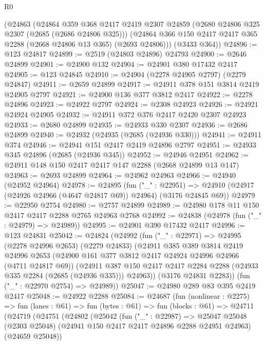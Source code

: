 \begin{lexlean}{R0}
\begin{coremodule}
    (@24863
      (@24864
        @359
        @368
        @2417
        @2419
        @2307
        @24859
        (@2680 @24806 @325 @2307 (@2685 (@2686 @24806 @325)))
        (@24864 @366 @150 @2417 @2417 @365 @2288 (@2668 @24806 @13 @365) (@2693 @24806)))
      (@3433 @364))
@24896 := @123 @24817
@24899 := @2519 (@24803 @24896) @24793
@24900 := @2646 @24899
@24901 := @24900 @132
@24904 := @24901 @380 @17432 @2417
@24905 := @123 @24845
@24910 := @24904 (@2278 @24905 @2797) (@2279 @24847)
@24911 := @2659 @24899
@24917 := @24911 @378 @151 @3814 @2419 @24905 @2797
@24921 := @24900 @136 @377 @3812 @2417
@24922 := @2278 @24896
@24923 := @24922 @2797
@24924 := @2308 @24923
@24926 := @24921 @24924 @24905
@24932 := @24911 @372 @376 @2417 @2420 @2307 @24923
@24933 := @2680 @24899
@24935 := @24933 @330 @2307
@24936 := @2686 @24899
@24940 := @24932 (@24935 (@2685 (@24936 @330)))
@24941 := @24911 @374
@24946 := @24941 @151 @2417 @2419 @24896 @2797
@24951 := @24933 @345 @24896 (@2685 (@24936 @345))
@24952 := @24946 @24951
@24962 := @24911 @148 @150 @2417 @2417 @147 @2288 (@2668 @24899 @13 @147)
@24963 := @2693 @24899
@24964 := @24962 @24963
@24966 := @24940 (@24952 @24964)
@24978 := @24895
    (fun ("_" : @22951) =>
    @24910 (@24917 (@24926 @24966 (@4647 @24817 @69)) @24964) (@3176 @24845 @69))
@24979 := @22950 @2754
@24980 := @2757 @24899
@24989 := @24980 @178 @11 @150 @2417 @2417 @2288 @2765 @24963 @2768
@24992 := @24838 (@24978 (fun ("_" : @24979) => @24989))
@24995 := @24901 @390 @17432 @2417
@24996 := @123 @24831
@25042 := @24824
    (@24992
      (fun ("_" : @22971) =>
      @24995
        (@2278 @24996 @2653)
        (@2279 @24833)
        (@24911
          @385
          @389
          @3814
          @2419
          @24996
          @2653
          (@24900 @161 @377 @3812 @2417 @24924 @24996 @24966 (@4711 @24817 @69))
          (@24911
            @387
            @150
            @2417
            @2417
            @2284
            @2288
            (@24933 @335 @2284 (@2685 (@24936 @335)))
            @24963))
        (@3176 @24831 @2283))
      (fun ("_" : @22970 @2754) => @24989))
@25047 := @24980 @289 @83 @395 @2419 @2417
@25048 := @24922 @2288
@25084 := @24687
    (fun (nonlinear : @2275) =>
    fun (lanes : @61) =>
    fun (bytes : @61) =>
    fun (blocks : @61) =>
    @24711
      (@24719
        (@24751
          (@24802
            (@25042
              (fun ("_" : @22987) =>
              @25047
                @25048
                (@2303 @25048)
                (@24941 @150 @2417 @2417 @24896 @2288 @24951 @24963)
                (@24659 @25048))

\end{coremodule}
\end{lexlean}

